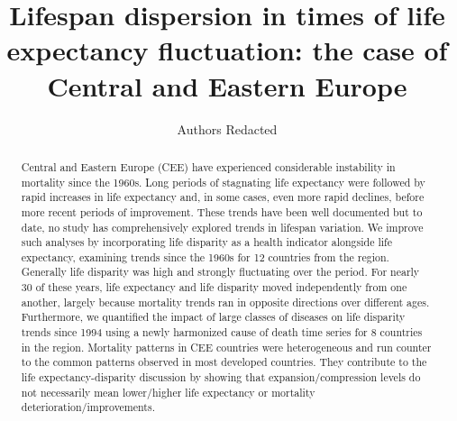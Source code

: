 \documentclass{article}
\title{Lifespan dispersion in times of life expectancy fluctuation: the case of Central and Eastern Europe}
\author[]{Authors Redacted}
\date{}
\begin{document}
\maketitle

\begin{abstract}
\textcolor[rgb]{1,0,0}{Central and Eastern Europe (CEE) have experienced considerable instability in mortality since the 1960s. Long periods of stagnating life expectancy were followed by rapid increases in life expectancy and, in some cases, even more rapid declines, before more recent periods of improvement. These trends have been well documented but to date, no study has comprehensively explored trends in lifespan variation.  We improve such analyses by incorporating life disparity as a health indicator alongside life expectancy, examining trends since the 1960s for 12 countries from the region. Generally life disparity was high and strongly fluctuating over the period. For nearly 30 of these years, life expectancy and life disparity moved independently from one another, largely because mortality trends ran in opposite directions over different ages. Furthermore, we quantified the \textcolor[rgb]{0,0.58,0}{impact of large classes of diseases on life disparity trends since 1994 using a newly harmonized cause of death time series for 8 countries in the region}. Mortality patterns in CEE countries were heterogeneous and run counter to the common patterns observed in most developed countries. They contribute to the life expectancy-disparity discussion by showing that expansion/compression levels do not necessarily mean lower/higher life expectancy or mortality deterioration/improvements.
}\end{abstract}


\newpage
\end{document}
